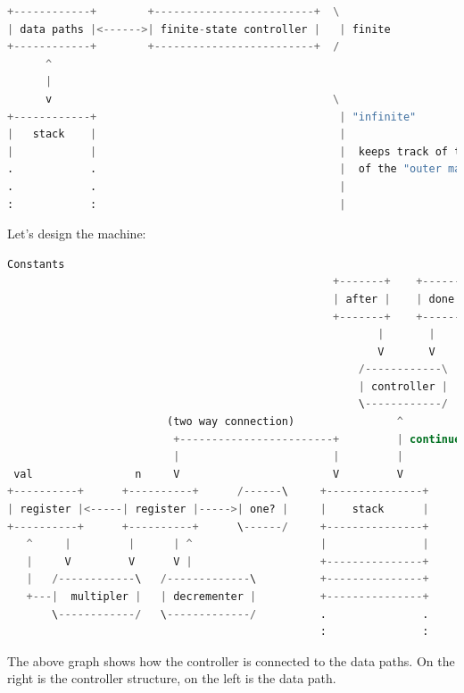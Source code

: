 \documentclass[a4paper,twoside]{article}
\numberwithin{equation}{section}
\begin{document}
\begin{lstlisting}[language = Python]
+------------+        +-------------------------+  \
| data paths |<------>| finite-state controller |   | finite
+------------+        +-------------------------+  /
      ^
      |
      v                                            \
+------------+                                      | "infinite"
|   stack    |                                      |
|            |                                      |  keeps track of the state
.            .                                      |  of the "outer machine"
.            .                                      |
:            :                                      |

\end{lstlisting}
Let's design the machine:
\begin{lstlisting}[language = Python]
                                                        Constants
                                                   +-------+    +------+
                                                   | after |    | done |
                                                   +-------+    +------+
                                                          |       |
                                                          V       V
                                                       /------------\
                                                       | controller |
                                                       \------------/
                         (two way connection)                ^
                          +------------------------+         | continue (connects the controller with the stack)
                          |                        |         |
 val                n     V                        V         V
+----------+      +----------+      /------\     +---------------+
| register |<-----| register |----->| one? |     |    stack      |
+----------+      +----------+      \------/     +---------------+
   ^     |         |      | ^                    |               |
   |     V         V      V |                    +---------------+
   |   /------------\   /-------------\          +---------------+
   +---|  multipler |   | decrementer |          +---------------+
       \------------/   \-------------/          .               .
                                                 :               :
\end{lstlisting}
The above graph shows how the controller is connected to the data paths.
On the right is the controller structure, on the left is the data path.
\end{document}
